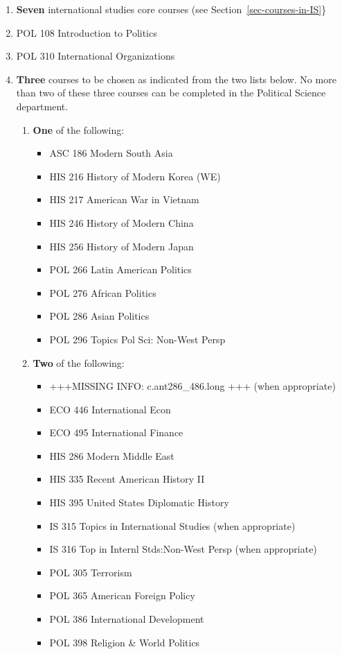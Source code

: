 \documentclass[
  letterpaper,
]{scrbook}
\providecommand{\tightlist}{%
  \setlength{\itemsep}{0pt}\setlength{\parskip}{0pt}}
\begin{document}
\begin{enumerate}
\def\labelenumi{\arabic{enumi}.}
\item
  \textbf{Seven} international studies core courses (see
  Section~\ref{sec-courses-in-IS}\}
\item
  POL 108 Introduction to Politics
\item
  POL 310 International Organizations
\item
  \textbf{Three} courses to be chosen as indicated from the two lists
  below. No more than two of these three courses can be completed in the
  Political Science department.

  \begin{enumerate}
  \def\labelenumii{\alph{enumii}.}
  \tightlist
  \item
    \textbf{One} of the following:

    \begin{itemize}
    \tightlist
    \item
      ASC 186 Modern South Asia
    \item
      HIS 216 History of Modern Korea (WE)
    \item
      HIS 217 American War in Vietnam
    \item
      HIS 246 History of Modern China
    \item
      HIS 256 History of Modern Japan
    \item
      POL 266 Latin American Politics
    \item
      POL 276 African Politics
    \item
      POL 286 Asian Politics
    \item
      POL 296 Topics Pol Sci: Non-West Persp
    \end{itemize}
  \item
    \textbf{Two} of the following:

    \begin{itemize}
    \tightlist
    \item
      +++MISSING INFO: c.ant286\_486.long +++ (when appropriate)
    \item
      ECO 446 International Econ
    \item
      ECO 495 International Finance
    \item
      HIS 286 Modern Middle East
    \item
      HIS 335 Recent American History II
    \item
      HIS 395 United States Diplomatic History
    \item
      IS 315 Topics in International Studies (when appropriate)
    \item
      IS 316 Top in Internl Stds:Non-West Persp (when appropriate)
    \item
      POL 305 Terrorism
    \item
      POL 365 American Foreign Policy
    \item
      POL 386 International Development
    \item
      POL 398 Religion \& World Politics
    \end{itemize}
  \end{enumerate}
\end{enumerate}
\end{document}
